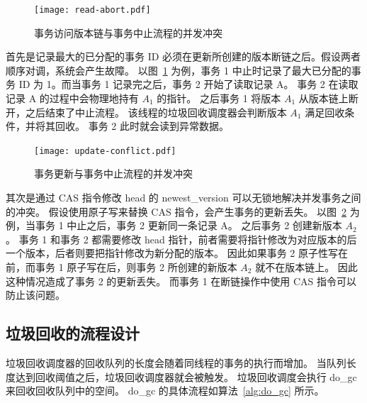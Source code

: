 \begin{figure}
    \centering
    \texttt{[image: read-abort.pdf]}
    \caption{事务访问版本链与事务中止流程的并发冲突}
    \label{fig:update-abort-read}
\end{figure}

首先是记录最大的已分配的事务 ID 必须在更新所创建的版本断链之后。假设两者顺序对调，系统会产生故障。
以图~\ref{fig:update-abort-read} 为例，事务 1 中止时记录了最大已分配的事务 ID 为 1。而当事务 1 记录完之后，事务 2 开始了读取记录 A。
事务 2 在读取记录 A 的过程中会物理地持有 $A_1$ 的指针。
之后事务 1 将版本 $A_1$ 从版本链上断开，之后结束了中止流程。
该线程的垃圾回收调度器会判断版本 $A_1$ 满足回收条件，并将其回收。
事务 2 此时就会读到异常数据。

\begin{figure}
    \centering
    \texttt{[image: update-conflict.pdf]}
    \caption{事务更新与事务中止流程的并发冲突}
    \label{fig:update-abort-update}
\end{figure}

其次是通过 CAS 指令修改 head 的 newest\_version 可以无锁地解决并发事务之间的冲突。
假设使用原子写来替换 CAS 指令，会产生事务的更新丢失。
以图~\ref{fig:update-abort-update} 为例，当事务 1 中止之后，事务 2 更新同一条记录 A。
之后事务 2 创建新版本 $A_2$。
事务 1 和事务 2 都需要修改 head 指针，前者需要将指针修改为对应版本的后一个版本，后者则要把指针修改为新分配的版本。
因此如果事务 2 原子性写在前，而事务 1 原子写在后，则事务 2 所创建的新版本 $A_2$ 就不在版本链上。
因此这种情况造成了事务 2 的更新丢失。
而事务 1 在断链操作中使用 CAS 指令可以防止该问题。





\subsection{垃圾回收的流程设计}
\label{ssec:gc-implement}

垃圾回收调度器的回收队列的长度会随着同线程的事务的执行而增加。
当队列长度达到回收阈值之后，垃圾回收调度器就会被触发。
垃圾回收调度会执行 do\_gc 来回收回收队列中的空间。
do\_gc 的具体流程如算法~\ref{alg:do_gc} 所示。

